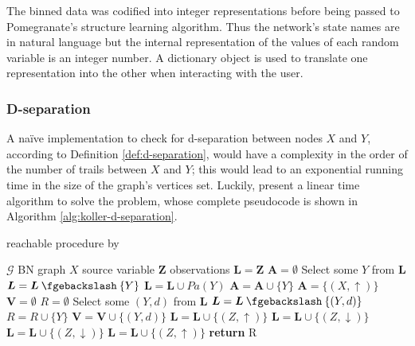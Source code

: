 The binned data was codified into integer representations before being passed to Pomegranate's structure learning algorithm.
Thus the network's state names are in natural language but the internal representation of the values of each random variable is an integer number.
A dictionary object is used to translate one representation into the other when interacting with the user.

\subsubsection{D-separation}
A na{\"i}ve implementation to check for d-separation between nodes $X$ and $Y$, according to Definition \ref{def:d-separation}, would have a complexity in the order of the number of trails between $X$ and $Y$; this would lead to an exponential running time in the size of the graph's vertices set.
Luckily, \citet{koller2007} present a linear time algorithm to solve the problem, whose complete pseudocode is shown in Algorithm \ref{alg:koller-d-separation}.

\begin{algorithm}[htp!]
	\caption{reachable procedure by \citet{koller2007}}
	\label{alg:koller-d-separation}
	\begin{algorithmic}[1]
		\State $\mathcal{G}$ BN graph
		\State $X$ source variable
		\State $\boldsymbol{Z}$ observations
		\State
		\State $\boldsymbol{L}= \boldsymbol{Z}$ 
		\State $\boldsymbol{A} = \emptyset$
			\State Select some $Y$ from $\boldsymbol{L}$
			\State $\boldsymbol{L}=\boldsymbol{L} \mysetminus \{Y\}$
				\State $\boldsymbol{L} = \boldsymbol{L} \cup Pa(Y)$
			\EndIf
			\State $\boldsymbol{A}=\boldsymbol{A} \cup \{Y\}$
		\EndWhile
		\State
		\State $\boldsymbol{A} = \{(X, \uparrow)\} $ 
		\State $\boldsymbol{V} = \emptyset$
		\State $R = \emptyset$
			\State Select some $(Y,d)$ from $\boldsymbol{L}$
			\State $\boldsymbol{L} = \boldsymbol{L} \mysetminus \{(Y,d)\}$
					\State $R = R \cup \{Y\}$
				\EndIf
				\State $\boldsymbol{V} = \boldsymbol{V} \cup \{(Y,d)\}$
						\State $\boldsymbol{L} = \boldsymbol{L} \cup \{(Z,\uparrow)\}$
					\EndFor
						\State $\boldsymbol{L} = \boldsymbol{L} \cup \{(Z,\downarrow)\}$
					\EndFor
							\State $\boldsymbol{L} = \boldsymbol{L} \cup \{(Z,\downarrow)\}$
						\EndFor
					\EndIf
							\State $\boldsymbol{L} = \boldsymbol{L} \cup \{(Z,\uparrow)\}$
						\EndFor
					\EndIf
				\EndIf
			\EndIf
		\EndWhile
		\State \textbf{return} R
	\end{algorithmic}
\end{algorithm}

